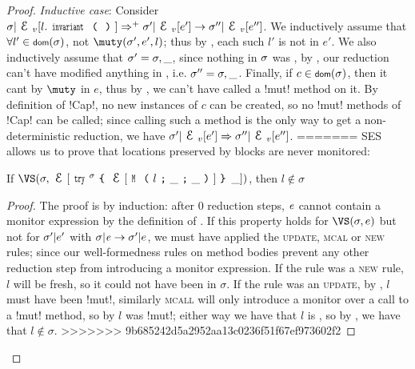 \begin{Assumption}
\begin{Assumption}
\begin{Assumption}
\begin{proof}
\emph{Inductive case}: Consider $\s|\EV[l.\invariant] \Rightarrow^+ \s'|\EV[e'] \rightarrow \s''|\EV[e'']$. We inductively assume that $\forall l' \in \dom(\s)$, not $\muty(\s', e', l)$; thus by , each such $l'$ is not \muty in $e'$. We also inductively assume that $\sigma' = \sigma,\_$, since nothing in $\sigma$ was \muty, by , our reduction can't have modified anything in \s, i.e. $\sigma'' = \sigma,\_$. Finally, if $c \in \dom(\s)$, then it cant by $\muty$ in $e$, thus by , we can't have called a \Q!mut! method on it. By definition of \Q!Cap!, no new instances of $c$ can be created, so no \Q!mut! methods of \Q!Cap! can be called; since calling such a method is the only way to get a non-deterministic reduction, we have $\s'|\EV[e'] \Rightarrow \s''|\EV[e'']$.
=======
SES allows us to prove that locations preserved by \Q@try@ blocks are never monitored:
\SS\begin{Lemma}\rm
	If $\VS(\s, \E[\Kw{try}^\sigma\oC\ctx[\M{l}{\_}{\_}]\cC\,\_])$, then $l\notin\sigma$
\end{Lemma}
\begin{proof}
The proof is by induction: after 0 reduction steps, ${\mathit{e}}$ cannot contain a monitor expression by the definition of \VS. If this property holds for $\VS(\s, e)$ but not for $\sigma'|e'$ with $\sigma|{\mathit{e}}\rightarrow \sigma'|e$, we must have applied the \textsc{update}, \textsc{mcal} or \textsc{new} rules; since our well-formedness rules on method bodies prevent any other reduction step from introducing a monitor expression. If the rule was a \textsc{new} rule, $l$ will be fresh, so it could not have been in $\sigma$. If the rule was an \textsc{update}, by , $l$ must have been \Q!mut!, similarly \textsc{mcall} will only introduce a monitor over a call to a \Q!mut! method, so by  $l$ was \Q!mut!; either way we have that $l$ is \tmuty, so by , we have that $l \notin \sigma$.
>>>>>>> 9b685242d5a2952aa13c0236f51f67ef973602f2
\end{proof}








\end{proof}
\end{Assumption}
\end{Assumption}
\end{Assumption}
